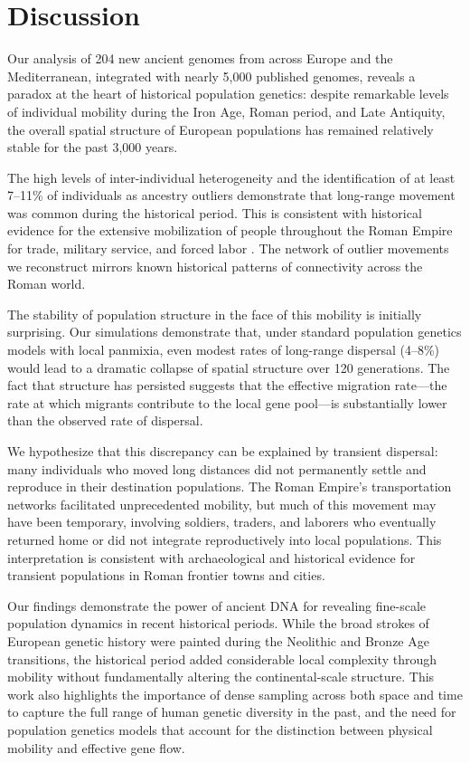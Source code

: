 \documentclass[11pt]{article}
\begin{document}
\section{Discussion}

Our analysis of 204 new ancient genomes from across Europe and the Mediterranean, integrated with nearly 5,000 published genomes, reveals a paradox at the heart of historical population genetics: despite remarkable levels of individual mobility during the Iron Age, Roman period, and Late Antiquity, the overall spatial structure of European populations has remained relatively stable for the past 3,000 years.

The high levels of inter-individual heterogeneity and the identification of at least 7--11\% of individuals as ancestry outliers demonstrate that long-range movement was common during the historical period. This is consistent with historical evidence for the extensive mobilization of people throughout the Roman Empire for trade, military service, and forced labor \citep{dejong2016, cherry2007, erdkamp2015, wardperkins2007}. The network of outlier movements we reconstruct mirrors known historical patterns of connectivity across the Roman world.

The stability of population structure in the face of this mobility is initially surprising. Our simulations demonstrate that, under standard population genetics models with local panmixia, even modest rates of long-range dispersal (4--8\%) would lead to a dramatic collapse of spatial structure over 120 generations. The fact that structure has persisted suggests that the effective migration rate---the rate at which migrants contribute to the local gene pool---is substantially lower than the observed rate of dispersal.

We hypothesize that this discrepancy can be explained by transient dispersal: many individuals who moved long distances did not permanently settle and reproduce in their destination populations. The Roman Empire's transportation networks facilitated unprecedented mobility, but much of this movement may have been temporary, involving soldiers, traders, and laborers who eventually returned home or did not integrate reproductively into local populations. This interpretation is consistent with archaeological and historical evidence for transient populations in Roman frontier towns and cities.

Our findings demonstrate the power of ancient DNA for revealing fine-scale population dynamics in recent historical periods. While the broad strokes of European genetic history were painted during the Neolithic and Bronze Age transitions, the historical period added considerable local complexity through mobility without fundamentally altering the continental-scale structure. This work also highlights the importance of dense sampling across both space and time to capture the full range of human genetic diversity in the past, and the need for population genetics models that account for the distinction between physical mobility and effective gene flow.
\end{document}
